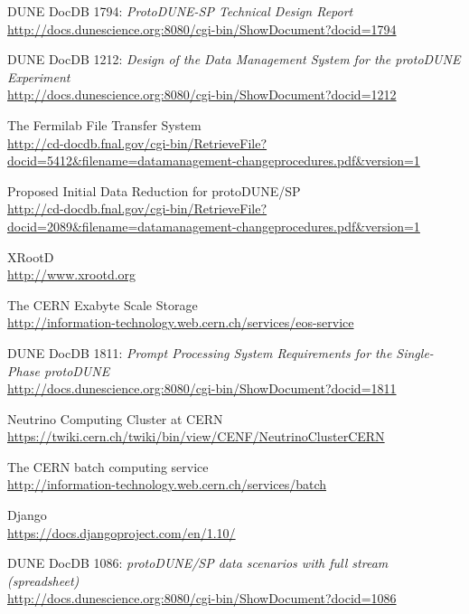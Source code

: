\documentclass[pdftex,12pt,letter]{article}
\begin{document}
\clearpage
\begin{thebibliography}{1}

{DUNE DocDB 1794: \textit{ProtoDUNE-SP Technical Design Report }}\\
\url{http://docs.dunescience.org:8080/cgi-bin/ShowDocument?docid=1794}



{DUNE DocDB 1212: \textit{Design of the Data Management System for the protoDUNE Experiment}}\\
\url{http://docs.dunescience.org:8080/cgi-bin/ShowDocument?docid=1212}

{The Fermilab File Transfer System}\\
\url{http://cd-docdb.fnal.gov/cgi-bin/RetrieveFile?docid=5412&filename=datamanagement-changeprocedures.pdf&version=1}



{Proposed Initial Data Reduction for protoDUNE/SP}\\
\url{http://cd-docdb.fnal.gov/cgi-bin/RetrieveFile?docid=2089&filename=datamanagement-changeprocedures.pdf&version=1}


{XRootD}\\
\url{http://www.xrootd.org}

{The CERN Exabyte Scale Storage}\\
\url{http://information-technology.web.cern.ch/services/eos-service}



{DUNE DocDB 1811: \textit{Prompt Processing System Requirements for the Single-Phase protoDUNE}}\\
\url{http://docs.dunescience.org:8080/cgi-bin/ShowDocument?docid=1811}



{Neutrino Computing Cluster at CERN}\\
\url{https://twiki.cern.ch/twiki/bin/view/CENF/NeutrinoClusterCERN}

{The CERN batch computing service}\\
\url{http://information-technology.web.cern.ch/services/batch}

{Django}\\
\url{https://docs.djangoproject.com/en/1.10/}


{DUNE DocDB 1086: \textit{ protoDUNE/SP data scenarios with full stream (spreadsheet)}}\\
\url{http://docs.dunescience.org:8080/cgi-bin/ShowDocument?docid=1086}




\end{thebibliography}
\end{document}
